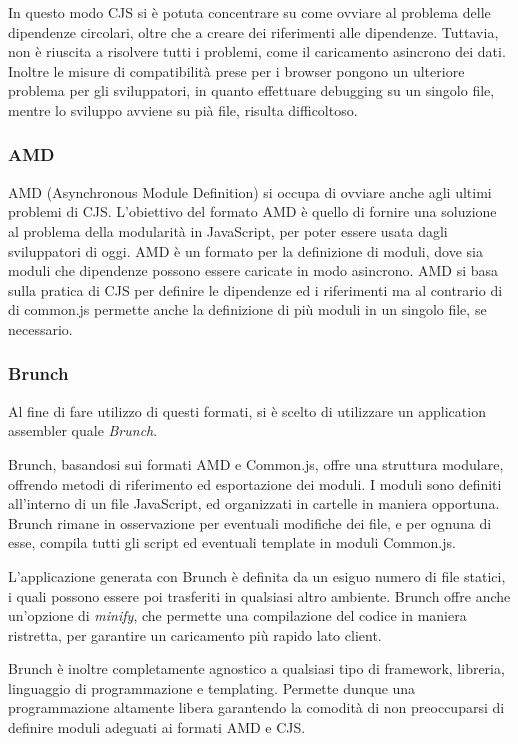 In questo modo CJS si è potuta concentrare su come ovviare al problema delle dipendenze circolari, oltre che a creare dei riferimenti alle dipendenze. Tuttavia, non è riuscita a risolvere tutti i problemi, come il caricamento asincrono dei dati. Inoltre le misure di compatibilità prese per i browser pongono un ulteriore problema per gli sviluppatori, in quanto effettuare debugging su un singolo file, mentre lo sviluppo avviene su pià file, risulta difficoltoso.
\subsubsection{AMD} %
\label{ssub:amd}
AMD (Asynchronous Module Definition) si occupa di ovviare anche agli ultimi problemi di CJS. L'obiettivo del formato AMD è quello di fornire una soluzione al problema della modularità in JavaScript, per poter essere usata dagli sviluppatori di oggi. AMD è un formato per la definizione di moduli, dove sia moduli che dipendenze possono essere caricate in modo asincrono. AMD si basa sulla pratica di CJS per definire le dipendenze ed i riferimenti ma al contrario di di common.js permette anche la definizione di più moduli in un singolo file, se necessario.
\newpage
\subsubsection{Brunch} %
\label{ssub:brunch_io}
Al fine di fare utilizzo di questi formati, si è scelto di utilizzare un application assembler quale {\itshape Brunch}.

Brunch, basandosi sui formati AMD e Common.js, offre una struttura modulare, offrendo metodi di riferimento ed esportazione dei moduli. I moduli sono definiti all'interno di un file JavaScript, ed organizzati in cartelle in maniera opportuna. Brunch rimane in osservazione per eventuali modifiche dei file, e per ognuna di esse, compila tutti gli script ed eventuali template in moduli Common.js.

L'applicazione generata con Brunch è definita da un esiguo numero di file statici, i quali possono essere poi trasferiti in qualsiasi altro ambiente. Brunch offre anche un'opzione di {\itshape minify}, che permette una compilazione del codice in maniera ristretta, per garantire un caricamento più rapido lato client.

Brunch è inoltre completamente agnostico a qualsiasi tipo di framework, libreria, linguaggio di programmazione e templating. Permette dunque una programmazione altamente libera garantendo la comodità di non preoccuparsi di definire moduli adeguati ai formati AMD e CJS.

